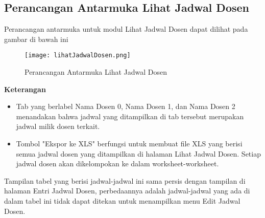 \subsection{Perancangan Antarmuka Lihat Jadwal Dosen}
Perancangan antarmuka untuk modul Lihat Jadwal Dosen dapat dilihat pada gambar di bawah ini
\begin{figure} [H]
	\centering  
	\texttt{[image: lihatJadwalDosen.png]}
	\caption[Perancangan Antarmuka Lihat Jadwal Dosen]{Perancangan Antarmuka Lihat Jadwal Dosen} 
	\label{fig:flow-chart-CodeIgniter} 
\end{figure}
\textbf{Keterangan}
\begin{itemize}
	\item Tab yang berlabel Nama Dosen 0, Nama Dosen 1, dan Nama Dosen 2 menandakan bahwa jadwal yang ditampilkan di tab tersebut merupakan jadwal milik dosen terkait.
	\item Tombol "Ekspor ke XLS" berfungsi untuk membuat file XLS yang berisi semua jadwal dosen yang ditampilkan di halaman Lihat Jadwal Dosen. Setiap jadwal dosen akan dikelompokan ke dalam worksheet-worksheet.
\end{itemize}
Tampilan tabel yang berisi jadwal-jadwal ini sama persis dengan tampilan di halaman Entri Jadwal Dosen, perbedaannya adalah jadwal-jadwal yang ada di dalam tabel ini tidak dapat ditekan untuk menampilkan menu Edit Jadwal Dosen.